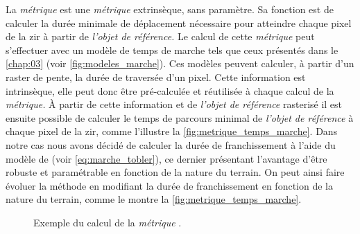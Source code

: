 La \emph{métrique}  est une \emph{métrique}
extrinsèque, sans paramètre. Sa fonction est de calculer la durée
minimale de déplacement nécessaire pour atteindre chaque pixel de la
\ac{zir} à partir de \emph{l'objet de référence.} Le calcul de cette
\emph{métrique} peut s'effectuer avec un modèle de temps de marche
tels que ceux présentés dans le \autoref{chap:03} (voir
\autoref{fig:modeles_marche}). Ces modèles peuvent calculer, à partir
d'un raster de pente, la durée de traversée d'un pixel. Cette
information est intrinsèque, elle peut donc être pré-calculée et
réutilisée à chaque calcul de la \emph{métrique.} À partir de cette
information et de \emph{l'objet de référence} rasterisé il est ensuite
possible de calculer le temps de parcours minimal de \emph{l'objet de
  référence} à chaque pixel de la \ac{zir}, comme l'illustre la
\autoref{fig:metrique_temps_marche}. Dans notre cas nous avons décidé
de calculer la durée de franchissement à l'aide du modèle de
\textcite{Tobler1993} (voir \autoref{eq:marche_tobler}), ce dernier
présentant l'avantage d'être robuste et paramétrable en fonction de la
nature du terrain. On peut ainsi faire évoluer la méthode en modifiant
la durée de franchissement en fonction de la nature du terrain, comme
le montre la \autoref{fig:metrique_temps_marche}.

\begin{figure}
  \centering
  
  \caption{Exemple du calcul de la \emph{métrique}
    \protect{}.}
  \label{fig:metrique_temps_marche}
\end{figure}

